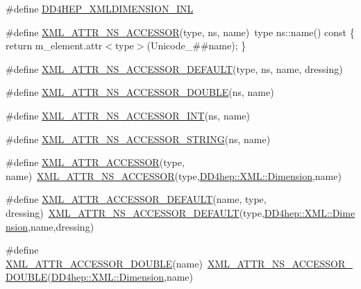 \begin{DoxyCompactItemize}
\item 
\#define \hyperlink{_x_m_l_dimension_8inl_ac453d10c915ef7f9fe1cda478fef8855}{D\+D4\+H\+E\+P\+\_\+\+X\+M\+L\+D\+I\+M\+E\+N\+S\+I\+O\+N\+\_\+\+I\+NL}
\item 
\#define \hyperlink{_x_m_l_dimension_8inl_a712f343791889ac7912b917b64ccb32a}{X\+M\+L\+\_\+\+A\+T\+T\+R\+\_\+\+N\+S\+\_\+\+A\+C\+C\+E\+S\+S\+OR}(type,  ns,  name)~type ns\+::name() const \{ return m\+\_\+element.\+attr$<$type$>$(Unicode\+\_\+\#\#name); \}
\item 
\#define \hyperlink{_x_m_l_dimension_8inl_a621d9cfc07f37e663ecb8f6c5bd22dfa}{X\+M\+L\+\_\+\+A\+T\+T\+R\+\_\+\+N\+S\+\_\+\+A\+C\+C\+E\+S\+S\+O\+R\+\_\+\+D\+E\+F\+A\+U\+LT}(type,  ns,  name,  dressing)
\item 
\#define \hyperlink{_x_m_l_dimension_8inl_a41ecea5c5f5c5ebc82e772c4dea4c97c}{X\+M\+L\+\_\+\+A\+T\+T\+R\+\_\+\+N\+S\+\_\+\+A\+C\+C\+E\+S\+S\+O\+R\+\_\+\+D\+O\+U\+B\+LE}(ns,  name)
\item 
\#define \hyperlink{_x_m_l_dimension_8inl_ad521d34a53e9f1ab96da2b2566438d95}{X\+M\+L\+\_\+\+A\+T\+T\+R\+\_\+\+N\+S\+\_\+\+A\+C\+C\+E\+S\+S\+O\+R\+\_\+\+I\+NT}(ns,  name)
\item 
\#define \hyperlink{_x_m_l_dimension_8inl_acd82de7a6fdd451bdc3f3d7665c66899}{X\+M\+L\+\_\+\+A\+T\+T\+R\+\_\+\+N\+S\+\_\+\+A\+C\+C\+E\+S\+S\+O\+R\+\_\+\+S\+T\+R\+I\+NG}(ns,  name)
\item 
\#define \hyperlink{_x_m_l_dimension_8inl_accabcb0a0a37bcff066b1281c9814553}{X\+M\+L\+\_\+\+A\+T\+T\+R\+\_\+\+A\+C\+C\+E\+S\+S\+OR}(type,  name)~\hyperlink{_x_m_l_dimension_8inl_a712f343791889ac7912b917b64ccb32a}{X\+M\+L\+\_\+\+A\+T\+T\+R\+\_\+\+N\+S\+\_\+\+A\+C\+C\+E\+S\+S\+OR}(type,\hyperlink{struct_d_d4hep_1_1_x_m_l_1_1_dimension}{D\+D4hep\+::\+X\+M\+L\+::\+Dimension},name)
\item 
\#define \hyperlink{_x_m_l_dimension_8inl_a5329c32158716b05939bad5ab5e572df}{X\+M\+L\+\_\+\+A\+T\+T\+R\+\_\+\+A\+C\+C\+E\+S\+S\+O\+R\+\_\+\+D\+E\+F\+A\+U\+LT}(name,  type,  dressing)~\hyperlink{_x_m_l_dimension_8inl_a621d9cfc07f37e663ecb8f6c5bd22dfa}{X\+M\+L\+\_\+\+A\+T\+T\+R\+\_\+\+N\+S\+\_\+\+A\+C\+C\+E\+S\+S\+O\+R\+\_\+\+D\+E\+F\+A\+U\+LT}(type,\hyperlink{struct_d_d4hep_1_1_x_m_l_1_1_dimension}{D\+D4hep\+::\+X\+M\+L\+::\+Dimension},name,dressing)
\item 
\#define \hyperlink{_x_m_l_dimension_8inl_a3b2602f2e6cdf903b4d9acd047d61b12}{X\+M\+L\+\_\+\+A\+T\+T\+R\+\_\+\+A\+C\+C\+E\+S\+S\+O\+R\+\_\+\+D\+O\+U\+B\+LE}(name)~\hyperlink{_x_m_l_dimension_8inl_a41ecea5c5f5c5ebc82e772c4dea4c97c}{X\+M\+L\+\_\+\+A\+T\+T\+R\+\_\+\+N\+S\+\_\+\+A\+C\+C\+E\+S\+S\+O\+R\+\_\+\+D\+O\+U\+B\+LE}(\hyperlink{struct_d_d4hep_1_1_x_m_l_1_1_dimension}{D\+D4hep\+::\+X\+M\+L\+::\+Dimension},name)

\end{DoxyCompactItemize}
